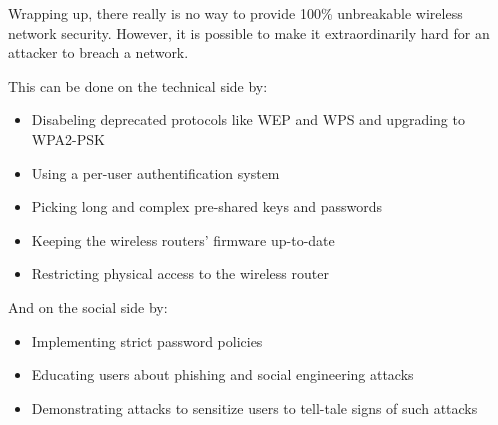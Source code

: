 Wrapping up, there really is no way to provide 100\% unbreakable wireless network security. However, it is possible to make it extraordinarily hard for an attacker to breach a network. 

This can be done on the technical side by:

\begin{itemize}

\item{Disabeling deprecated protocols like WEP and WPS and upgrading to WPA2-PSK}

\item{Using a per-user authentification system}

\item{Picking long and complex pre-shared keys and passwords}

\item{Keeping the wireless routers' firmware up-to-date}

\item{Restricting physical access to the wireless router}

\end{itemize}

And on the social side by:

\begin{itemize}

\item{Implementing strict password policies}

\item{Educating users about phishing and social engineering attacks}

\item{Demonstrating attacks to sensitize users to tell-tale signs of such attacks}

\end{itemize}
